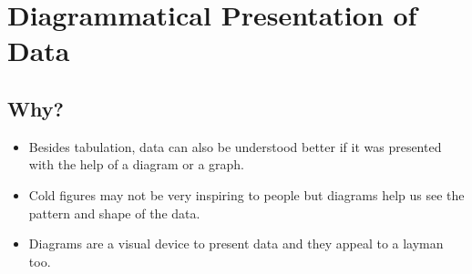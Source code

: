 \documentclass[
10pt, %
a4paper, %
]{report}
\begin{document}
\section*{Diagrammatical Presentation of Data}

\subsection*{Why?}
\begin{itemize}
\item Besides tabulation, data can also be understood better if it was presented with the help of a diagram or a graph.
\item Cold figures may not be very inspiring to people but diagrams help us see the pattern and shape of the data.
\item Diagrams are a visual device to present data and they appeal to a layman too.
\end{itemize}
\end{document}
